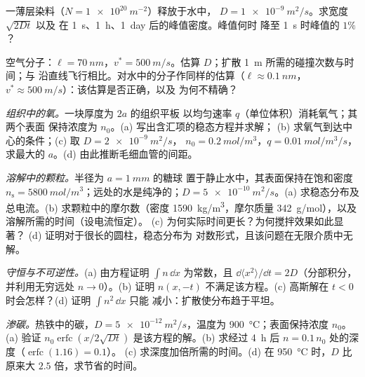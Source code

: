 \begin{exercise}[$\star$]\label{exo:b2:particle-diffusion:3}
一薄层染料（$N = \qty{1e20}{m^{-2}}$）释放于水中，
$D = \qty{1e-9}{m^2/s}$。求宽度 $\sqrt{2Dt}$ 以及
在 \qty{1}{s}、\qty{1}{h}、\qty{1}{day} 后的峰值密度。峰值何时
降至 \qty{1}{s} 时峰值的 $1\%$？
\end{exercise}

\begin{exercise}[$\star$]\label{exo:b2:particle-diffusion:4}
空气分子：$\ell = \qty{70}{nm}$，$v^* = \qty{500}{m/s}$。估算
$D$；扩散 \qty{1}{m} 所需的碰撞次数与时间；与
沿直线飞行相比。对水中的分子作同样的估算（$\ell \approx
\qty{0.1}{nm}$，$v^* \approx \qty{500}{m/s}$）：该估算是否正确，以及
为何不精确？
\end{exercise}

\begin{exercise}[$\star\star$]\label{exo:b2:particle-diffusion:5}
\emph{组织中的氧。}一块厚度为 $2a$ 的组织平板
以均匀速率 $q$（单位体积）消耗氧气；其两个表面
保持浓度为 $n_0$。(a) 写出含汇项的稳态方程并求解；
(b) 求氧气到达中心的条件；(c) 取 $D = \qty{2e-9}{m^2/s}$，
$n_0 = \qty{0.2}{mol/m^3}$，$q = \qty{0.01}{mol/m^3/s}$，求最大的 $a$。(d)
由此推断毛细血管的间距。
\end{exercise}

\begin{exercise}[$\star\star$]\label{exo:b2:particle-diffusion:6}
\emph{溶解中的颗粒。}半径为 $a = \qty{1}{mm}$ 的糖球
置于静止水中，其表面保持在饱和密度 $n_{\text{s}}
= \qty{5800}{mol/m^3}$；远处的水是纯净的；$D =
\qty{5e-10}{m^2/s}$。(a) 求稳态分布及总电流。(b)
求颗粒中的摩尔数（密度 \qty{1590}{kg/m^3}，摩尔质量
\qty{342}{g/mol}），以及溶解所需的时间（设电流恒定）。
(c) 为何实际时间更长？为何搅拌效果如此显著？
(d) 证明对于很长的圆柱，稳态分布为
对数形式，且该问题在无限介质中无解。
\end{exercise}

\begin{exercise}[$\star\star$]\label{exo:b2:particle-diffusion:7}
\emph{守恒与不可逆性。}(a) 由方程证明
$\int n\,\dd x$ 为常数，且 $\dd\langle x^2\rangle/\dd t =
2D$（分部积分，并利用无穷远处 $n \to 0$）。(b) 证明
$n(x,-t)$ 不满足该方程。(c) 高斯解在
$t < 0$ 时会怎样？(d) 证明 $\int n^2\,\dd x$ 只能
减小：扩散使分布趋于平坦。
\end{exercise}

\begin{exercise}[$\star\star$]\label{exo:b2:particle-diffusion:8}
\emph{渗碳。}热铁中的碳，$D = \qty{5e-12}{m^2/s}$，温度为
\qty{900}{\celsius}；表面保持浓度 $n_0$。(a) 验证 $n_0
\operatorname{erfc}(x/2\sqrt{Dt})$ 是该方程的解。(b) 求经过 \qty{4}{h} 后
$n = 0.1\,n_0$ 处的深度（$\operatorname{erfc}(1.16) = 0.1$）。
(c) 求深度加倍所需的时间。(d) 在 \qty{950}{\celsius} 时，$D$ 比原来大
$2.5$ 倍，求节省的时间。
\end{exercise}

